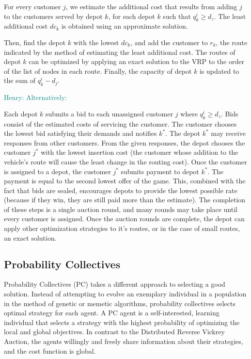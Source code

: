 \documentclass{sig-alternate}
\newcommand{\allcomments}[1]{{#1}}
\newcommand{\hfcomment}[1]{\textcolor{Teal}{\allcomments{Henry: {#1}}}}
\begin{document}
For every customer $j$, we estimate the additional cost that results from adding $j$ to the customers served by depot $k$, for each depot $k$ such that $q_k^i \geq d_z$. The least additional cost $dc_k$ is obtained using an approximate solution.

Then, find the depot $k$ with the lowest $dc_k$, and add the customer to $r_k$, the route indicated by the method of estimating the least additional cost. The routes of depot $k$ can be optimized by applying an exact solution to the VRP to the order of the list of nodes in each route.
Finally, the capacity of depot $k$ is updated to the sum of $q_k^i-d_j$.

\hfcomment{Alternatively:}

Each depot $k$ submits a bid to each unassigned customer $j$ where $q_k^i \geq d_z$. Bids consist of the estimated costs of servicing the customer. The customer chooses the lowest bid satisfying their demands and notifies $k^*$. The depot $k^*$ may receive responses from other customers. From the given responses, the depot chooses the customer $j^*$ with the lowest insertion cost (the customer whose addition to  the vehicle's route will cause the least change  in the routing cost). Once the customer is assigned to a depot, the customer $j^*$ submits payment to depot $k^*$. The payment is equal to the second lowest offer of the game. This, combined with the fact that bids are sealed, encourages depots to provide the lowest possible rate (because if they win, they are still paid more than the estimate). The completion of these steps is a single auction round, and many rounds may take place until every customer is assigned. Once the auction rounds are complete, the depot can apply other optimization strategies to it's routes, or in the case of small routes, an exact solution.

\subsection{Probability Collectives}
\label{ssec:PC}
Probability Collectives (PC) %
takes a different approach to selecting a good solution. Instead of attempting to evolve an exemplary individual in a population in the method of genetic or memetic algorithms, probability collectives selects optimal strategy for each agent\cite{Kulkarni:2008}. A PC agent is a self-interested, learning individual that selects a strategy with the highest probability of optimizing the local and global objectives. In contrast to the Distributed Reverse Vickrey Auction, the agents willingly and freely share information about their strategies, and the cost function is global.%
\end{document}
